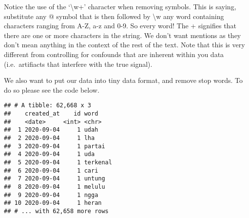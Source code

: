 \documentclass[
]{article}
\newenvironment{Shaded}{\begin{snugshade}}{\end{snugshade}}
\newcommand{\CharTok}[1]{\textcolor[rgb]{0.31,0.60,0.02}{#1}}
\newcommand{\CommentTok}[1]{\textcolor[rgb]{0.56,0.35,0.01}{\textit{#1}}}
\newcommand{\DataTypeTok}[1]{\textcolor[rgb]{0.13,0.29,0.53}{#1}}
\newcommand{\KeywordTok}[1]{\textcolor[rgb]{0.13,0.29,0.53}{\textbf{#1}}}
\newcommand{\NormalTok}[1]{#1}
\newcommand{\OperatorTok}[1]{\textcolor[rgb]{0.81,0.36,0.00}{\textbf{#1}}}
\newcommand{\StringTok}[1]{\textcolor[rgb]{0.31,0.60,0.02}{#1}}
\begin{document}
Notice the use of the `\textbackslash w+' character when removing
symbols. This is saying, substitute any @ symbol that is then followed
by \textbackslash w any word containing characters ranging from A-Z, a-z
and 0-9. So every word! The + signifies that there are one or more
characters in the string. We don't want mentions as they don't mean
anything in the context of the rest of the text. Note that this is very
different from controlling for confounds that are inherent within you
data (i.e.~artifiacts that interfere with the true signal).

We also want to put our data into tiny data format, and remove stop
words. To do so please see the code below.

\begin{Shaded}
\end{Shaded}

\begin{verbatim}
## # A tibble: 62,668 x 3
##    created_at    id word    
##    <date>     <int> <chr>   
##  1 2020-09-04     1 udah    
##  2 2020-09-04     1 lha     
##  3 2020-09-04     1 partai  
##  4 2020-09-04     1 uda     
##  5 2020-09-04     1 terkenal
##  6 2020-09-04     1 cari    
##  7 2020-09-04     1 untung  
##  8 2020-09-04     1 melulu  
##  9 2020-09-04     1 ngga    
## 10 2020-09-04     1 heran   
## # ... with 62,658 more rows
\end{verbatim}
\end{document}
